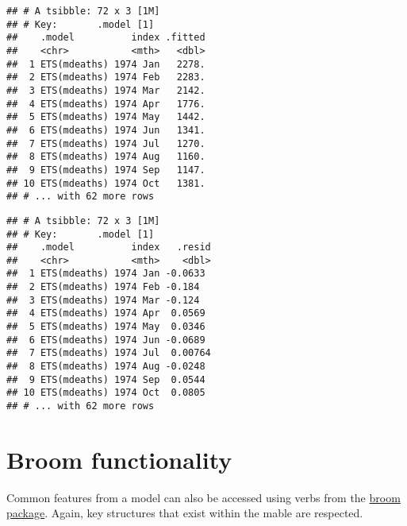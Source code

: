 \documentclass[]{book}
\newenvironment{Shaded}{\begin{snugshade}}{\end{snugshade}}
\newcommand{\NormalTok}[1]{#1}
\newcommand{\OperatorTok}[1]{\textcolor[rgb]{0.81,0.36,0.00}{\textbf{#1}}}
\newcommand{\StringTok}[1]{\textcolor[rgb]{0.31,0.60,0.02}{#1}}
\begin{document}
\begin{verbatim}
## # A tsibble: 72 x 3 [1M]
## # Key:       .model [1]
##    .model          index .fitted
##    <chr>           <mth>   <dbl>
##  1 ETS(mdeaths) 1974 Jan   2278.
##  2 ETS(mdeaths) 1974 Feb   2283.
##  3 ETS(mdeaths) 1974 Mar   2142.
##  4 ETS(mdeaths) 1974 Apr   1776.
##  5 ETS(mdeaths) 1974 May   1442.
##  6 ETS(mdeaths) 1974 Jun   1341.
##  7 ETS(mdeaths) 1974 Jul   1270.
##  8 ETS(mdeaths) 1974 Aug   1160.
##  9 ETS(mdeaths) 1974 Sep   1147.
## 10 ETS(mdeaths) 1974 Oct   1381.
## # ... with 62 more rows
\end{verbatim}

\begin{Shaded}
\end{Shaded}

\begin{verbatim}
## # A tsibble: 72 x 3 [1M]
## # Key:       .model [1]
##    .model          index   .resid
##    <chr>           <mth>    <dbl>
##  1 ETS(mdeaths) 1974 Jan -0.0633 
##  2 ETS(mdeaths) 1974 Feb -0.184  
##  3 ETS(mdeaths) 1974 Mar -0.124  
##  4 ETS(mdeaths) 1974 Apr  0.0569 
##  5 ETS(mdeaths) 1974 May  0.0346 
##  6 ETS(mdeaths) 1974 Jun -0.0689 
##  7 ETS(mdeaths) 1974 Jul  0.00764
##  8 ETS(mdeaths) 1974 Aug -0.0248 
##  9 ETS(mdeaths) 1974 Sep  0.0544 
## 10 ETS(mdeaths) 1974 Oct  0.0805 
## # ... with 62 more rows
\end{verbatim}

\hypertarget{broom-functionality}{%
\section{Broom functionality}\label{broom-functionality}}

Common features from a model can also be accessed using verbs from the \href{https://github.com/tidymodels/broom}{broom package}. Again, key structures that exist within the mable are respected.

\begin{Shaded}
\end{Shaded}
\end{document}
